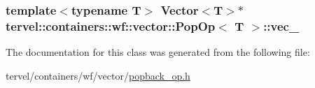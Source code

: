 \subsubsection[{vec\+\_\+}]{\setlength{\rightskip}{0pt plus 5cm}template$<$typename T$>$ Vector$<$T$>$$\ast$ {\bf tervel\+::containers\+::wf\+::vector\+::\+Pop\+Op}$<$ T $>$\+::vec\+\_\+\hspace{0.3cm}{\ttfamily [private]}}\label{classtervel_1_1containers_1_1wf_1_1vector_1_1_pop_op_a32b0803cfcf70ab2b86b59b6790eb676}


The documentation for this class was generated from the following file\+:\begin{DoxyCompactItemize}
\item 
tervel/containers/wf/vector/\hyperlink{popback__op_8h}{popback\+\_\+op.\+h}\end{DoxyCompactItemize}
